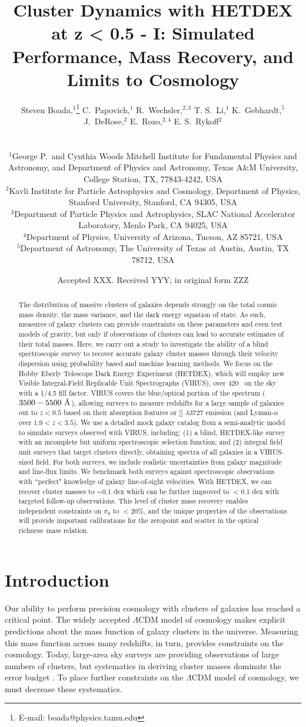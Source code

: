 \documentclass[fleqn,usenatbib]{mnras}
\title[Galaxy Clusters with HETDEX]{Cluster Dynamics with HETDEX at z < 0.5 - I: Simulated Performance, Mass Recovery, and Limits to Cosmology}
\author[S. Boada et al.]
{\parbox{\textwidth}{Steven Boada,$^{1}$\thanks{E-mail: boada@physics.tamu.edu}
C.~Papovich,$^{1}$
R.~Wechsler,$^{2,3}$
T. S.~Li,$^{1}$
K.~Gebhardt,$^{5}$
J.~DeRose,$^{2}$
E.~Rozo,$^{2,4}$
E. S.~Rykoff$^{2}$}\vspace{0.4cm}\
\\
\parbox{\textwidth}{$^{1}$George P.\ and Cynthia Woods Mitchell Institute for Fundamental Physics and Astronomy, and Department of Physics and Astronomy, Texas A\&M University, College Station, TX, 77843-4242, USA\\
$^{2}$Kavli Institute for Particle Astrophysics and Cosmology, Department of Physics, Stanford University, Stanford, CA 94305, USA\\
$^{3}$Department of Particle Physics and Astrophysics, SLAC National Accelerator Laboratory, Menlo Park, CA 94025, USA\\
$^{4}$Department of Physics, University of Arizona, Tucson, AZ 85721, USA\\
$^{5}$Department of Astronomy, The University of Texas at Austin, Austin, TX 78712, USA}}
\date{Accepted XXX. Received YYY; in original form ZZZ}
\begin{document}
\label{firstpage}
\pagerange{\pageref{firstpage}--\pageref{lastpage}}
\maketitle

\begin{abstract}
\noindent
The distribution of massive clusters of galaxies depends strongly on the total cosmic mass density, the mass variance, and the dark energy equation of state. As such, measures of galaxy clusters can provide constraints on these parameters and even test models of gravity, but only if observations of clusters can lead to accurate estimates of their total masses. Here, we carry out a study to investigate the ability of a blind spectroscopic survey to recover accurate galaxy cluster masses through their velocity dispersion using probability based and machine learning methods. We focus on the Hobby Eberly Telescope Dark Energy Experiment (HETDEX), which will employ new Visible Integral-Field Replicable Unit Spectrographs (VIRUS), over 420 \degsq\ on the sky with a 1/4.5 fill factor. VIRUS covers the blue/optical portion of the spectrum ($3500-5500~\hbox{\AA}$), allowing surveys to measure redshifts for a large sample of galaxies out to $z < 0.5$ based on their absorption features or [] $\lambda$3727 emission (and Lyman-$\alpha$ over $1.9 < z < 3.5$). We use a detailed mock galaxy catalog from a semi-analytic model to simulate surveys observed with VIRUS, including: (1) a blind, HETDEX-like survey with an incomplete but uniform spectroscopic selection function; and (2) integral field unit surveys that target clusters directly, obtaining spectra of all galaxies in a VIRUS-sized field. For both surveys, we include realistic uncertainties from galaxy magnitude and line-flux limits. We benchmark both surveys against spectroscopic observations with ``perfect" knowledge of galaxy line-of-sight velocities. With HETDEX, we can recover cluster masses to $\sim0.1$ dex which can be further improved to $<0.1$ dex with targeted follow-up observations. This level of cluster mass recovery enables independent constraints on $\sigma_8$ to $<20$\%, and the unique properties of the observations will provide important calibrations for the zeropoint and scatter in the optical richness--mass relation.
\end{abstract}

\section{Introduction}\label{sec: Introduction}
Our ability to perform precision cosmology with clusters of galaxies has reached a critical point. The widely accepted $\Lambda$CDM model of cosmology makes explicit predictions about the mass function of galaxy clusters in the universe. Measuring this mass function across many redshifts, in turn, provides constraints on the cosmology. Today, large-area sky surveys are providing observations of large numbers of clusters, but systematics in deriving cluster masses dominate the error budget . To place further constraints on the $\Lambda$CDM model of cosmology, we must decrease these systematics. 
\end{document}

